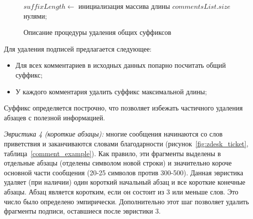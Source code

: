 \begin{figure}[tph!]
\begin{algorithm}[H]
		\SetAlgoLined
		$suffixLength \leftarrow$ инициализация массива длины $commentsList.size$ нулями;\\
		
\end{algorithm}
	\caption{Описание процедуры удаления общих суффиксов}
	\label{algo1}
\end{figure}
\vskip 2mm
Для удаления подписей предлагается следующее:

 \begin{itemize}
\item Для всех комментариев в исходных данных попарно посчитать общий суффикс;
\item У каждого комментария удалить суффикс максимальной длины;
\end{itemize}

Суффикс определяется построчно, что позволяет избежать частичного удаления абзацев с полезной информацией.

\textit{Эвристика 4 (короткие абзацы):} многие сообщения начинаются со слов приветствия и заканчиваются словами благодарности (рисунок~\ref{fig:zdesk_ticket}, таблица~\ref{comment_example}). Как правило, эти фрагменты выделены в отдельные абзацы (отделены символом новой строки) и значительно короче основной части сообщения (20-25 символов против 300-500). Данная эвристика удаляет (при наличии) один короткий начальный абзац и все короткие конечные абзацы. Абзац является коротким, если он состоит из 3 или меньше слов. Это число было определено эмпирически. Дополнительно этот шаг позволяет удалить фрагменты подписи, оставшиеся после эвристики 3.

